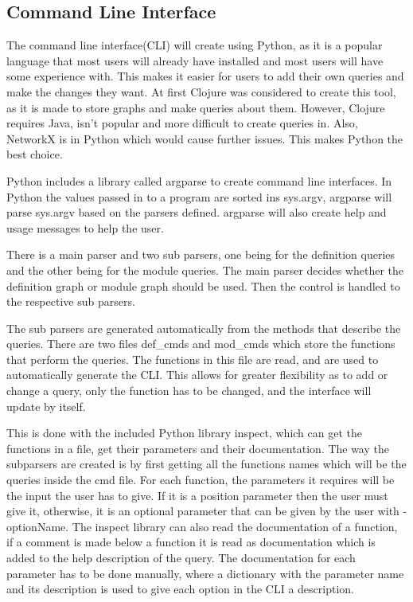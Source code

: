 \subsection{Command Line Interface}\label{sub:Agda Tree CLI}

The command line interface(CLI) will create using Python, as it is a popular
language that most users will already have installed and most users will have
some experience with. This makes it easier for users to add their own queries
and make the changes they want. At first Clojure was considered to create this
tool, as it is made to store graphs and make queries about them. However,
Clojure requires Java, isn't popular and more difficult to create queries in.
Also, NetworkX is in Python which would cause further issues. This makes Python
the best choice.

Python includes a library called argparse to create command line interfaces. In
Python the values passed in to a program are sorted ins sys.argv, argparse will
parse sys.argv based on the parsers defined. argparse will also create help and
usage messages to help the user.

There is a main parser and two sub parsers, one being for the definition
queries and the other being for the module queries. The main parser decides
whether the definition graph or module graph should be used. Then the control is
handled to the respective sub parsers.

The sub parsers are generated automatically from the methods that describe the
queries. There are two files def\_cmds and mod\_cmds which store the functions
that perform the queries. The functions in this file are read, and are used to
automatically generate the CLI. This allows for greater flexibility as to add
or change a query, only the function has to be changed, and the interface will
update by itself.

This is done with the included Python library inspect, which can get the
functions in a file, get their parameters and their documentation. The way the
subparsers are created is by first getting all the functions names which will
be the queries inside the cmd file. For each function, the parameters it
requires will be the input the user has to give. If it is a position parameter
then the user must give it, otherwise, it is an optional parameter that can be
given by the user with -optionName. The inspect library can also read the
documentation of a function, if a comment is made below a function it is read
as documentation which is added to the help description of the query. The
documentation for each parameter has to be done manually, where a dictionary
with the parameter name and its description is used to give each option in the
CLI a description.

